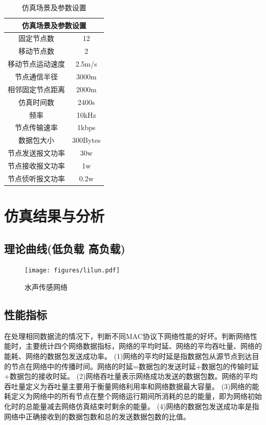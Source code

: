 \begin{table}[!htp]
	\centering
\caption{仿真场景及参数设置}
\begin{tabular}{|c|c|}%
	\hline  %
	\multicolumn{2}{|c|}{仿真场景及参数设置}\\
	\hline  %
	固定节点数& 12\\
	\hline
	移动节点数& 2\\
	\hline
	移动节点运动速度& 2.5m/s\\
	\hline
	节点通信半径& 3000m\\
	\hline
	相邻固定节点距离& 2000m\\
	\hline
	仿真时间数& 2400s\\
	\hline
	频率& 10kHz\\
	\hline				
	节点传输速率& 1kbps\\
	\hline
	数据包大小& 300Bytes\\
	\hline
	节点发送报文功率& 30w\\
	\hline				
	节点接收报文功率& 1w\\
	\hline
	节点侦听报文功率& 0.2w\\	
	\hline	
\end{tabular}
\label{tab2}
\end{table}

\section {仿真结果与分析}
\subsection{理论曲线(低负载 高负载)}
\begin{figure}[!ht]
	\centering
	\texttt{[image: figures/lilun.pdf]}
	\caption{
		水声传感网络
	}
	\label{fig:example}
\end{figure}
\subsection{性能指标}
 在处理相同数据流的情况下，判断不同MAC协议下网络性能的好坏。判断网络性能时，主要统计四个网络数据指标，网络的平均时延、网络的平均吞吐量、网络的能耗、网络的数据包发送成功率。
 (1)网络的平均时延是指数据包从源节点到达目的节点在网络中的传播时间。网络的时延=数据包的发送时延+数据包的传输时延+数据包的接收时延。 
 (2)网络吞吐量表示网络成功发送的数据包数。网络的平均吞吐量定义为吞吐量主要用于衡量网络利用率和网络数据最大容量。
 (3)网络的能耗定义为网络中的所有节点在整个网络运行期间所消耗的总的能量，即为网络初始化时的总能量减去网络仿真结束时剩余的能量。
 (4)网络的数据包发送成功率是指网络中正确接收到的数据包数和总的发送数据包数的比值。
